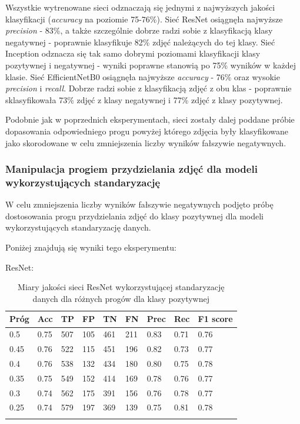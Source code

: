 \documentclass[polish,12pt]{aghthesis}
\begin{document}
Wszystkie wytrenowane sieci odznaczają się jednymi z najwyższych jakości klasyfikacji (\textit{accuracy} na poziomie 75-76\%). Sieć ResNet osiągnęła najwyższe \textit{precision} - 83\%, a także szczególnie dobrze radzi sobie z klasyfikacją klasy negatywnej - poprawnie klasyfikuje 82\% zdjęć należących do tej klasy. Sieć Inception odznacza się tak samo dobrymi poziomami klasyfikacji klasy pozytywnej i negatywnej - wyniki poprawne stanowią po 75\% wyników w każdej klasie. Sieć EfficientNetB0 osiągnęła najwyższe \textit{accuracy} - 76\% oraz wysokie \textit{precision} i \textit{recall}. Dobrze radzi sobie z klasyfikacją zdjęć z obu klas - poprawnie sklasyfikowała 73\% zdjęć z klasy negatywnej i 77\% zdjęć z klasy pozytywnej.
\par Podobnie jak w poprzednich eksperymentach, sieci zostały dalej poddane próbie dopasowania odpowiedniego progu powyżej którego zdjęcia były klasyfikowane jako skorodowane w celu zmniejszenia liczby wyników fałszywie negatywnych.


\subsubsection{Manipulacja progiem przydzielania zdjęć dla modeli wykorzystujących standaryzację}

\par W celu zmniejszenia liczby wyników fałszywie negatywnych podjęto próbę dostosowania progu przydzielania zdjęć do klasy pozytywnej dla modeli wykorzystujących standaryzację danych. 
\vspace{3mm}
\par\noindent Poniżej znajdują się wyniki tego eksperymentu:
\vspace{3mm}
\par\noindent ResNet:
\renewcommand{\arraystretch}{1.7}
 \begin{longtable}[h!]{|m{2.0cm}|m{1.2cm}|m{1.2cm}|m{1.2cm}|m{1.2cm}|m{1.2cm}|m{1.2cm}|m{1.2cm}|m{1.6cm}|}
 \hline
 Próg & Acc & TP & FP & TN & FN & Prec & Rec & F1 score\\
 \hline
 0.5 & 0.75 & 507 & 105 & 461 & 211 & 0.83 & 0.71 & 0.76\\
 \hline
 0.45 & 0.76 & 522 & 115 & 451 & 196 & 0.82 & 0.73 & 0.77\\
 \hline
 0.4 & 0.76 & 538 & 132 & 434 & 180 & 0.80 & 0.75 & 0.78\\
 \hline
 0.35 & 0.75 & 549 & 152 & 414 & 169 & 0.78 & 0.76 & 0.77\\
 \hline
 0.3 & 0.74 & 562 & 175 & 391 & 156 & 0.76 & 0.78 & 0.77\\
 \hline
 0.25 & 0.74 & 579 & 197 & 369 & 139 & 0.75 & 0.81 & 0.78\\
 \hline
\caption{Miary jakości sieci ResNet wykorzystującej standaryzację danych dla różnych progów dla klasy pozytywnej}
\label{table:43}
\end{longtable}
\end{document}
